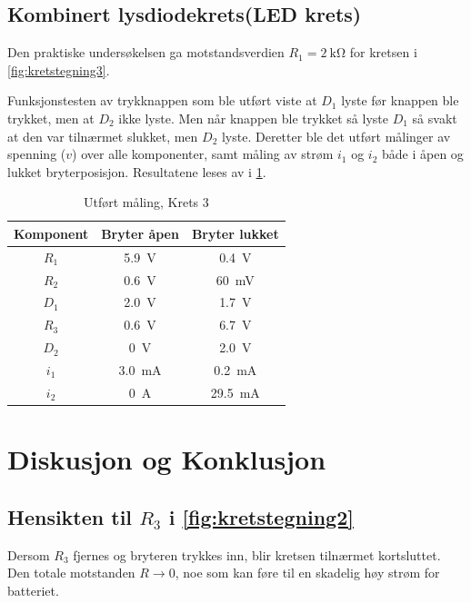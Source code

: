 \documentclass[11pt,a4paper,twocolumn]{article}
\begin{document}
\subsection{Kombinert lysdiodekrets(LED krets)}

Den praktiske undersøkelsen ga motstandsverdien
$R_1 = \qty{2}{\kilo\ohm}$ for kretsen i
\cref{fig:kretstegning3}.

Funksjonstesten av trykknappen som ble utført viste at $D_1$ lyste før knappen ble trykket, men at $D_2$ ikke lyste. Men når knappen ble trykket så lyste $D_1$ så svakt at den var tilnærmet slukket, men $D_2$ lyste. Deretter ble det utført målinger av spenning ($v$) over alle komponenter, samt måling av strøm $i_1$ og $i_2$ både i åpen og lukket bryterposisjon. Resultatene leses av i \cref{tab:krets3_resultater}.

\begin{table}[h]
	\centering
	\setlength{\belowcaptionskip}{6pt}
	\caption{Utført måling, Krets 3}
	\label{tab:krets3_resultater}
	\noindent
	\begin{tabular}{@{}ccc@{}}
		\hline
		Komponent & Bryter åpen & Bryter lukket \\
		\hline
		$R_1$ & \qty{5,9}{\volt} & \qty{0,4}{\volt}\\
		$R_2$ & \qty{0,6}{\volt} & \qty{60}{\milli\volt}\\
		$D_1$ & \qty{2,0}{\volt} & \qty{1,7}{\volt}\\
		$R_3$ & \qty{0,6}{\volt} & \qty{6,7}{\volt}\\
		$D_2$ & \qty{0}{\volt} & \qty{2,0}{\volt}\\
		$i_1$ & \qty{3,0}{\milli\ampere} & \qty{0,2}{\milli\ampere}\\
		$i_2$ & \qty{0}{\ampere} & \qty{29,5}{\milli\ampere}\\
		\hline
	\end{tabular}
\end{table}


\section{Diskusjon og Konklusjon}

\subsection{Hensikten til $R_3$ i \cref{fig:kretstegning2}}

Dersom $R_3$ fjernes og bryteren trykkes inn, blir kretsen tilnærmet kortsluttet. Den totale motstanden $R \to 0$, noe som kan føre til en skadelig høy strøm for batteriet.
\end{document}
